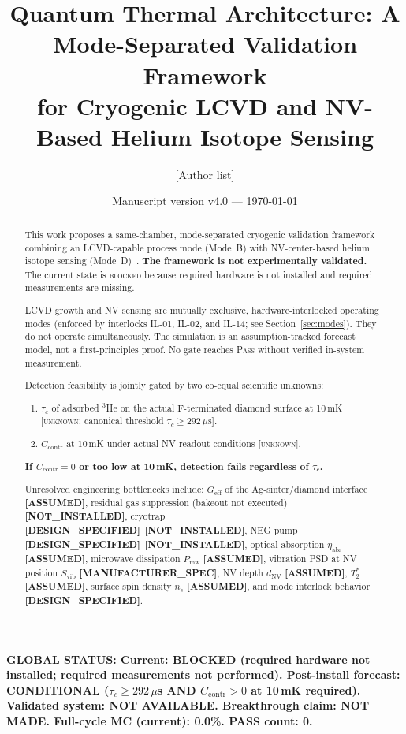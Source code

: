\documentclass[12pt,a4paper]{article}
\title{\textbf{Quantum Thermal Architecture: A Mode-Separated Validation Framework\\
for Cryogenic LCVD and NV-Based Helium Isotope Sensing}}
\author{[Author list]}
\date{Manuscript version v4.0 --- \today}
\newcommand{\blocked}{\textsc{blocked}}
\newcommand{\unknown}{\textsc{unknown}}
\newcommand{\assumed}{\textbf{[ASSUMED]}}
\newcommand{\designspec}{\textbf{[DESIGN\_SPECIFIED]}}
\newcommand{\notinstalled}{\textbf{[NOT\_INSTALLED]}}
\newcommand{\mfrspec}{\textbf{[MANUFACTURER\_SPEC]}}
\newcommand{\verdictbox}[1]{%
  \vspace{0.5em}\par
  \noindent\colorbox{yellow!30}{\parbox{\dimexpr\linewidth-2\fboxsep}{\bfseries #1}}\par
  \vspace{0.5em}
}
\begin{document}
\maketitle

\verdictbox{GLOBAL STATUS:
Current: BLOCKED (required hardware not installed; required measurements not performed).
Post-install forecast: CONDITIONAL ($\tau_c \geq 292\,\mu$s AND $C_\mathrm{contr}>0$ at 10\,mK required).
Validated system: NOT AVAILABLE.
Breakthrough claim: NOT MADE.
Full-cycle MC (current): 0.0\%.
PASS count: 0.}

\begin{abstract}
This work proposes a same-chamber, mode-separated cryogenic validation framework
combining an LCVD-capable process mode (Mode~B) with NV-center-based helium
isotope sensing (Mode~D)~\cite{Pobell2007,DegenRMP2017}.
\textbf{The framework is not experimentally validated.}
The current state is \blocked{} because required hardware is not installed
and required measurements are missing.

LCVD growth and NV sensing are mutually exclusive, hardware-interlocked
operating modes (enforced by interlocks IL-01, IL-02, and IL-14; see
Section~\ref{sec:modes}).
They do not operate simultaneously.
The simulation is an assumption-tracked forecast model, not a first-principles proof.
No gate reaches \textsc{Pass} without verified in-system measurement.

Detection feasibility is jointly gated by two co-equal scientific unknowns:
\begin{enumerate}[noitemsep]
  \item $\tau_c$ of adsorbed $^3$He on the actual F-terminated diamond surface
        at 10\,mK \cite{Bernu2006,MorhardPRB1996} [\unknown{}; canonical threshold $\tau_c \geq 292\,\mu$s].
  \item $C_\mathrm{contr}$ at 10\,mK under actual NV readout conditions
        \cite{DegenRMP2017,Sangtawesin2019} [\unknown{}].
\end{enumerate}
\textbf{If $C_\mathrm{contr} = 0$ or too low at 10\,mK, detection fails
regardless of $\tau_c$.}

Unresolved engineering bottlenecks include: $G_\mathrm{eff}$ of the
Ag-sinter/diamond interface \assumed{}, residual gas suppression
(bakeout not executed) \notinstalled{}, cryotrap \designspec{}~\notinstalled{},
NEG pump \designspec{}~\notinstalled{}, optical absorption $\eta_\mathrm{abs}$ \assumed{},
microwave dissipation $P_\mathrm{mw}$ \assumed{},
vibration PSD at NV position $S_\mathrm{vib}$ \mfrspec{},
NV depth $d_\mathrm{NV}$ \assumed{}, $T_2^*$ \assumed{},
surface spin density $n_s$ \assumed{}, and mode interlock behavior \designspec{}.


\end{abstract}
\end{document}
